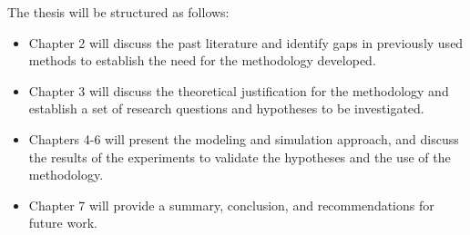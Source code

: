 \indent The thesis will be structured as follows:  
\begin{itemize}
\item{Chapter 2 will discuss the past literature and identify gaps in previously used methods to establish the need for the methodology developed.}
\item{Chapter 3 will discuss the theoretical justification for the methodology and establish a set of research questions and hypotheses to be investigated.}
\item{Chapters 4-6 will present the modeling and simulation approach, and discuss the results of the experiments to validate the hypotheses and the use of the methodology.}
\item{Chapter 7 will provide a summary, conclusion, and recommendations for future work.}
\end{itemize}

